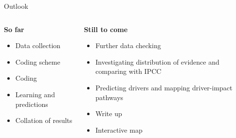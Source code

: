 \documentclass[9pt]{beamer}
\begin{document}
\begin{frame}{Outlook}
\begin{columns}[t]
	\begin{column}{0.5\linewidth}
		\textbf{So far}
		
		\begin{itemize}
			\item Data collection
			\item Coding scheme
			\item Coding
			\item Learning and predictions
			\item Collation of results
		\end{itemize}
	\end{column}
	\begin{column}{0.5\linewidth}
		\textbf{Still to come}
		\begin{itemize}
			\item Further data checking
			\item Investigating distribution of evidence and comparing with IPCC
			\item Predicting drivers and mapping driver-impact pathways
			\item Write up
			\item Interactive map
		\end{itemize}
	\end{column}
\end{columns}
\end{frame}
\end{document}
